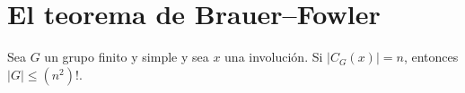 \chapter{El teorema de Brauer--Fowler}

\begin{theorem}
Sea $G$ un grupo finito y simple y sea $x$ una involución. Si $|C_G(x)|=n$, entonces $|G|\leq (n^2)!$.	
\end{theorem}

